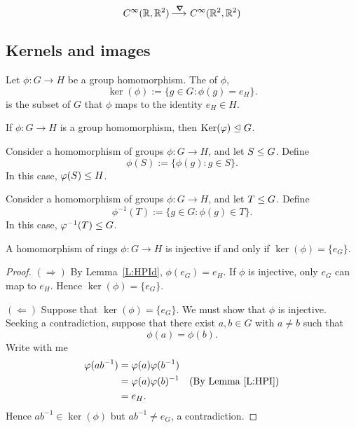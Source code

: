 \documentclass{ximera}
\begin{document}
\[
C^\infty(\R,\R^2) \lto^{\grad} C^\infty(\R^2,\R^2)
\]








\subsection{Kernels and images}



\begin{definition}
  Let $\phi:G\to H$ be a group homomorphism. The  of
  $\phi$,
  \[
  \ker(\phi) := \{g\in G: \phi(g) = e_H\}.
  \]
  is the subset of $G$ that $\phi$ maps to the identity $e_H\in H$.
\end{definition}


\begin{lemma}\label{L:kerN}
  If $\phi:G\to H$ is a group homomorphism, then $\ker(\phi)\normal G$.
\end{lemma}

\begin{lemma}\label{L:hps}
  Consider a homomorphism of groups $\phi:G\to H$, and let $S\subgp
  G$. Define
  \[
  \phi(S) := \{\phi(g): g\in S\}.
  \]
  In this case, $\phi(S) \subgp H$.
\end{lemma}



\begin{lemma}\label{L:pps}
  Consider a homomorphism of groups $\phi:G\to H$, and let $T\subgp
  G$. Define
  \[
  \phi^{-1}(T) := \{g\in G: \phi(g)\in T\}.
  \]
  In this case, $\phi^{-1}(T) \subgp G$.
\end{lemma}



\begin{lemma}
  A homomorphism of rings $\phi:G\to H$ is injective if and only if
  $\ker(\phi) = \{e_G\}$.
  \begin{proof}
    $(\Rightarrow)$ By Lemma~\ref{L:HPId}, $\phi(e_G) = e_H$. If
    $\phi$ is injective, only $e_G$ can map to $e_H$. Hence
    $\ker(\phi) = \{e_G\}$.


    $(\Leftarrow)$ Suppose that $\ker(\phi) = \{e_G\}$. We must show
    that $\phi$ is injective. Seeking a contradiction, suppose that
    there exist $a,b\in G$ with $a\ne b$ such that
    \[
    \phi(a) = \phi(b).
    \]
    Write with me
    \begin{align*}
      \phi(ab^{-1}) &=\phi(a)\phi(b^{-1})\\
      &= \phi(a) \phi(b)^{-1} & \text{(By Lemma~\ref{L:HPI})}\\
      &= e_H.
    \end{align*}
    Hence $ab^{-1}\in\ker(\phi)$ but $ab^{-1}\ne e_G$, a
    contradiction.
  \end{proof}
\end{lemma}
\end{document}
